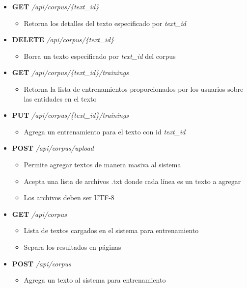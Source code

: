 \documentclass[12pt,a4paper,]{scrartcl}
\providecommand{\tightlist}{%
  \setlength{\itemsep}{0pt}\setlength{\parskip}{0pt}}
\begin{document}
\begin{itemize}
\tightlist
\item
  \textbf{GET} \emph{/api/corpus/\{text\_id\}}

  \begin{itemize}
  \tightlist
  \item
    Retorna los detalles del texto especificado por \emph{text\_id}
  \end{itemize}
\item
  \textbf{DELETE} \emph{/api/corpus/\{text\_id\}}

  \begin{itemize}
  \tightlist
  \item
    Borra un texto especificado por \emph{text\_id} del corpus
  \end{itemize}
\item
  \textbf{GET} \emph{/api/corpus/\{text\_id\}/trainings}

  \begin{itemize}
  \tightlist
  \item
    Retorna la lista de entrenamientos proporcionados por los usuarios sobre las entidades en el texto
  \end{itemize}
\item
  \textbf{PUT} \emph{/api/corpus/\{text\_id\}/trainings}

  \begin{itemize}
  \tightlist
  \item
    Agrega un entrenamiento para el texto con id \emph{text\_id}
  \end{itemize}
\item
  \textbf{POST} \emph{/api/corpus/upload}

  \begin{itemize}
  \tightlist
  \item
    Permite agregar textos de manera masiva al sistema
  \item
    Acepta una lista de archivos .txt donde cada línea es un texto a agregar
  \item
    Los archivos deben ser UTF-8
  \end{itemize}
\item
  \textbf{GET} \emph{/api/corpus}

  \begin{itemize}
  \tightlist
  \item
    Lista de textos cargados en el sistema para entrenamiento
  \item
    Separa los resultados en páginas
  \end{itemize}
\item
  \textbf{POST} \emph{/api/corpus}

  \begin{itemize}
  \tightlist
  \item
    Agrega un texto al sistema para entrenamiento
  \end{itemize}
\end{itemize}
\end{document}
